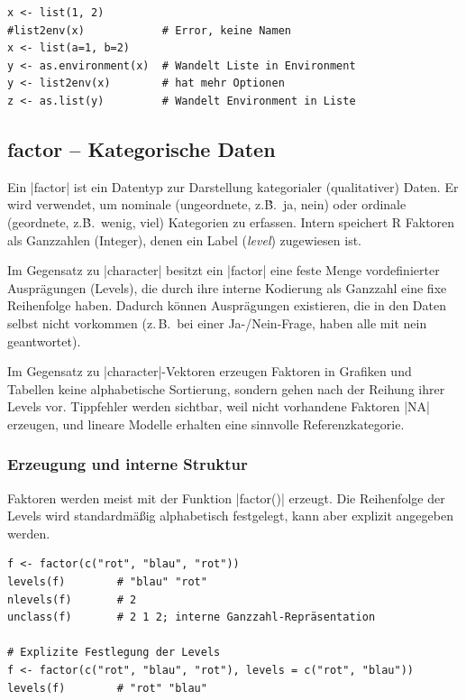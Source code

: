 \documentclass[10pt,twocolumn]{scrartcl}
\renewcommand{\lstinline}{\mycoloredinline}
\begin{document}
\begin{lstlisting}
x <- list(1, 2)
#list2env(x)            # Error, keine Namen
x <- list(a=1, b=2)
y <- as.environment(x)  # Wandelt Liste in Environment
y <- list2env(x)        # hat mehr Optionen
z <- as.list(y)         # Wandelt Environment in Liste
\end{lstlisting}



\subsection{factor -- Kategorische Daten}

Ein \lstinline|factor| ist ein Datentyp zur Darstellung kategorialer (qualitativer) Daten. Er wird verwendet, um nominale (ungeordnete, z.\.B.\ ja, nein) oder ordinale (geordnete, z.\.B.\ wenig, viel) Kategorien zu erfassen. Intern speichert R Faktoren als Ganzzahlen (Integer), denen ein Label (\emph{level}) zugewiesen ist.

Im Gegensatz zu \lstinline|character| besitzt ein \lstinline|factor| eine feste Menge vordefinierter Ausprägungen (Levels), die durch ihre interne Kodierung als Ganzzahl eine fixe Reihenfolge haben. Dadurch können Ausprägungen existieren, die in den Daten selbst nicht vorkommen (z.\,B.\ bei einer Ja-/Nein-Frage, haben alle mit nein geantwortet).

Im Gegensatz zu \lstinline|character|-Vektoren erzeugen Faktoren in Grafiken und Tabellen keine alphabetische Sortierung, sondern gehen nach der Reihung ihrer Levels vor. Tippfehler werden sichtbar, weil nicht vorhandene Faktoren \lstinline|NA| erzeugen, und lineare Modelle erhalten eine sinnvolle Referenzkategorie.


\subsubsection{Erzeugung und interne Struktur}

Faktoren werden meist mit der Funktion \lstinline|factor()| erzeugt. Die Reihenfolge der Levels wird standardmäßig alphabetisch festgelegt, kann aber explizit angegeben werden.

\begin{lstlisting}
f <- factor(c("rot", "blau", "rot")) 
levels(f)        # "blau" "rot"
nlevels(f)       # 2
unclass(f)       # 2 1 2; interne Ganzzahl-Repräsentation

# Explizite Festlegung der Levels
f <- factor(c("rot", "blau", "rot"), levels = c("rot", "blau"))
levels(f)        # "rot" "blau"
\end{lstlisting}
\end{document}
